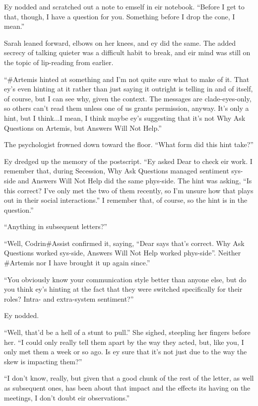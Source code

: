 Ey nodded and scratched out a note to emself in eir notebook. ``Before I get to that, though, I have a question for you. Something before I drop the cone, I mean.''

Sarah leaned forward, elbows on her knees, and ey did the same. The added secrecy of talking quieter was a difficult habit to break, and eir mind was still on the topic of lip-reading from earlier.

``\#Artemis hinted at something and I'm not quite sure what to make of it. That ey's even hinting at it rather than just saying it outright is telling in and of itself, of course, but I can see why, given the context. The messages are clade-eyes-only, so others can't read them unless one of us grants permission, anyway. It's only a hint, but I think...I mean, I think maybe ey's suggesting that it's not Why Ask Questions on Artemis, but Answers Will Not Help.''

The psychologist frowned down toward the floor. ``What form did this hint take?''

Ey dredged up the memory of the postscript. ``Ey asked Dear to check eir work. I remember that, during Secession, Why Ask Questions managed sentiment sys-side and Answers Will Not Help did the same phys-side. The hint was asking, ``Is this correct? I've only met the two of them recently, so I'm unsure how that plays out in their social interactions.'' I remember that, of course, so the hint is in the question.''

``Anything in subsequent letters?''

``Well, Codrin\#Assist confirmed it, saying, ``Dear says that's correct. Why Ask Questions worked sys-side, Answers Will Not Help worked phys-side''. Neither \#Artemis nor I have brought it up again since.''

``You obviously know your communication style better than anyone else, but do you think ey's hinting at the fact that they were switched specifically for their roles? Intra- and extra-system sentiment?''

Ey nodded.

``Well, that'd be a hell of a stunt to pull.'' She sighed, steepling her fingers before her. ``I could only really tell them apart by the way they acted, but, like you, I only met them a week or so ago. Is ey sure that it's not just due to the way the skew is impacting them?''

``I don't know, really, but given that a good chunk of the rest of the letter, as well as subsequent ones, has been about that impact and the effects its having on the meetings, I don't doubt eir observations.''

